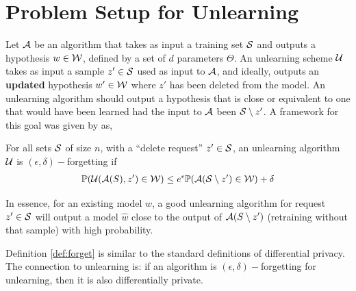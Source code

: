 \section{Problem Setup for Unlearning}
Let $\mathcal{A}$ be an algorithm that takes as input a training set $\mathcal{S}$ and outputs a hypothesis $w \in \mathcal{W}$, defined by a set of $d$ parameters $\Theta$. 
An unlearning scheme $\mathcal{U}$ takes as input a sample $z' \in \mathcal{S}$ used as input to $\mathcal{A}$, and ideally, outputs an \textbf{updated} hypothesis $w' \in \mathcal{W}$ where $z'$ has been deleted from the model.
%
%
An unlearning algorithm should output a hypothesis that is close or equivalent to one that would have been learned had the input to $\mathcal{A}$ been $\mathcal{S} \setminus z^\prime$. A framework for this goal was given by \cite{ginart2019making} as,
\begin{definition}\label{def:forget}
For all sets $\mathcal{S}$ of size $n$, with a ``delete request'' $z' \in \mathcal{S}$, an unlearning algorithm $\mathcal{U}$ is $(\epsilon, \delta)-$forgetting if
\begin{align}
\mathbb{P}(\mathcal{U}(\mathcal{A}(S), z') \in \mathcal{W}) \leq e^\epsilon\mathbb{P}(\mathcal{A}(\mathcal{S}\setminus z') \in \mathcal{W}) + \delta
\end{align}
\end{definition}
In essence, for an existing model $w$, a good unlearning algorithm for request $z' \in \mathcal{S}$ will output a model $\hat{w}$ close to the output of $\mathcal{A}(S \setminus z')$ (retraining without that sample) with high probability.

\begin{remark}
Definition \ref{def:forget} is similar to the standard definitions of differential privacy. The connection to unlearning is: if an algorithm is $(\epsilon, \delta)-$forgetting for unlearning, then it is also differentially private. 
\end{remark}

